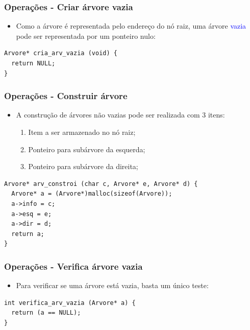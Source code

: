 \documentclass{beamer}
\newcommand{\tcb}[1]{\textcolor{blue}{#1}}
\begin{document}
\begin{frame}[fragile]
  \frametitle{Operações - Criar árvore vazia}

  \begin{itemize}
    \item Como a árvore é representada pelo endereço do nó raiz, uma árvore \tcb{vazia} pode ser representada por um ponteiro nulo:
  \end{itemize}

  \begin{verbatim}
Arvore* cria_arv_vazia (void) {
  return NULL;
}
  \end{verbatim}
\end{frame}

\begin{frame}[fragile]
  \frametitle{Operações - Construir árvore}

  \begin{itemize}
    \item A construção de árvores não vazias pode ser realizada com 3 itens:
    \begin{enumerate}
      \item Item a ser armazenado no nó raiz;
      \item Ponteiro para subárvore da esquerda;
      \item Ponteiro para subárvore da direita;
    \end{enumerate}
  \end{itemize}

  \begin{verbatim}
Arvore* arv_constroi (char c, Arvore* e, Arvore* d) {
  Arvore* a = (Arvore*)malloc(sizeof(Arvore));
  a->info = c;
  a->esq = e;
  a->dir = d;
  return a;
}
  \end{verbatim}

\end{frame}

\begin{frame}[fragile]
  \frametitle{Operações - Verifica árvore vazia}

  \begin{itemize}
    \item Para verificar se uma árvore está vazia, basta um único teste:
  \end{itemize}

  \begin{verbatim}
int verifica_arv_vazia (Arvore* a) {
  return (a == NULL);
}
  \end{verbatim}
\end{frame}
\end{document}
